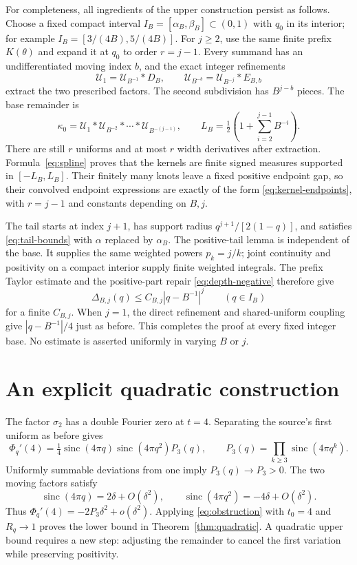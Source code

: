 \documentclass[11pt,letterpaper]{article}
\theoremstyle{remark}\newtheorem{remark}[theorem]{Remark}
\newcommand{\Un}{\mathcal U}\newcommand{\Law}{\mathcal L}
\newcommand{\sinc}{\operatorname{sinc}}
\begin{document}
For completeness, all ingredients of the upper construction persist as follows. Choose a fixed compact interval $I_B=[\alpha_B,\beta_B]\subset(0,1)$ with $q_0$ in its interior; for example $I_B=[3/(4B),5/(4B)]$. For $j\ge2$, use the same finite prefix $K(\theta)$ and expand it at $q_0$ to order $r=j-1$. Every summand has an undifferentiated moving index $b$, and the exact integer refinements
\[
\Un_1=\Un_{B^{-1}}*D_B,\qquad
\Un_{B^{-b}}=\Un_{B^{-j}}*E_{B,b}
\]
extract the two prescribed factors. The second subdivision has $B^{j-b}$ pieces. The base remainder is
\[
\kappa_0=\Un_1*\Un_{B^{-2}}*\cdots*\Un_{B^{-(j-1)}},
\qquad L_B=\tfrac12\left(1+\sum_{i=2}^{j-1}B^{-i}\right).
\]
There are still $r$ uniforms and at most $r$ width derivatives after extraction. Formula~\eqref{eq:spline} proves that the kernels are finite signed measures supported in $[-L_B,L_B]$. Their finitely many knots leave a fixed positive endpoint gap, so their convolved endpoint expressions are exactly of the form \eqref{eq:kernel-endpoints}, with $r=j-1$ and constants depending on $B,j$.

The tail starts at index $j+1$, has support radius $q^{j+1}/[2(1-q)]$, and satisfies \eqref{eq:tail-bounds} with $\alpha$ replaced by $\alpha_B$. The positive-tail lemma is independent of the base. It supplies the same weighted powers $p_k=j/k$; joint continuity and positivity on a compact interior supply finite weighted integrals. The prefix Taylor estimate and the positive-part repair \eqref{eq:depth-negative} therefore give
\[
\Delta_{B,j}(q)\le C_{B,j}|q-B^{-1}|^j\qquad(q\in I_B)
\]
for a finite $C_{B,j}$. When $j=1$, the direct refinement and shared-uniform coupling give $|q-B^{-1}|/4$ just as before. This completes the proof at every fixed integer base. No estimate is asserted uniformly in varying $B$ or $j$.

\section{An explicit quadratic construction}\label{sec:quadratic-lower}

The factor $\sigma_2$ has a double Fourier zero at $t=4$. Separating the source's first uniform as before gives
\[
\Phi_q'(4)=\tfrac14\sinc(4\pi q)\sinc(4\pi q^2)P_3(q),
\qquad P_3(q)=\prod_{k\ge3}\sinc(4\pi q^k).
\]
Uniformly summable deviations from one imply $P_3(q)\to P_3>0$. The two moving factors satisfy
\[
\sinc(4\pi q)=2\delta+O(\delta^2),\qquad
\sinc(4\pi q^2)=-4\delta+O(\delta^2).
\]
Thus $\Phi_q'(4)=-2P_3\delta^2+o(\delta^2)$. Applying \eqref{eq:obstruction} with $t_0=4$ and $R_q\to1$ proves the lower bound in Theorem~\ref{thm:quadratic}. A quadratic upper bound requires a new step: adjusting the remainder to cancel the first variation while preserving positivity.
\end{document}
